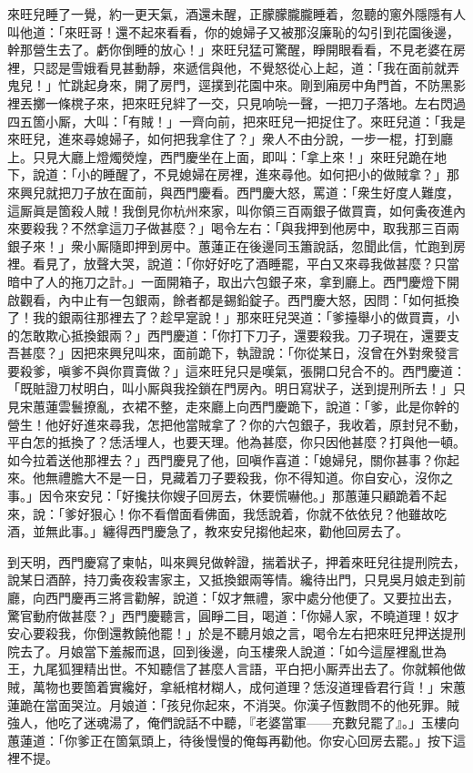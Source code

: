 來旺兒睡了一覺，約一更天氣，酒還未醒，正朦朦朧朧睡着，忽聽的窻外隱隱有人叫他道：「來旺哥！還不起來看看，你的媳婦子又被那沒廉恥的勾引到花園後邊，幹那營生去了。虧你倒睡的放心！」{}來旺兒猛可驚醒，睜開眼看看，不見老婆在房裡，只認是雪娥看見甚動靜，來遞信與他，不覺怒從心上起，道：「我在面前就弄鬼兒！」忙跳起身來，開了房門，逕撲到花園中來。剛到廂房中角門首，不防黑影裡丟擲一條櫈子來，把來旺兒絆了一交，只見响喨一聲，一把刀子落地。左右閃過四五箇小厮，大叫：「有賊！」一齊向前，把來旺兒一把捉住了。來旺兒道：「我是來旺兒，進來尋媳婦子，如何把我拿住了？」衆人不由分說，一步一棍，打到廳上。只見大廳上燈燭熒煌，西門慶坐在上面，即叫：「拿上來！」來旺兒跪在地下，說道：「小的睡醒了，不見媳婦在房裡，進來尋他。如何把小的做賊拿？」那來興兒就把刀子放在面前，與西門慶看。西門慶大怒，罵道：「衆生好度人難度，這厮眞是箇殺人賊！我倒見你杭州來家，叫你領三百兩銀子做買賣，如何夤夜進內來要殺我？不然拿這刀子做甚麼？」喝令左右：「與我押到他房中，取我那三百兩銀子來！」衆小厮隨即押到房中。蕙蓮正在後邊同玉簫說話，忽聞此信，忙跑到房裡。看見了，放聲大哭，說道：「你好好吃了酒睡罷，平白又來尋我做甚麼？只當暗中了人的拖刀之計。」一面開箱子，取出六包銀子來，拿到廳上。西門慶燈下開啟觀看，內中止有一包銀兩，餘者都是錫鉛錠子。西門慶大怒，因問：「如何抵換了！我的銀兩往那裡去了？趁早寔說！」那來旺兒哭道：「爹擡舉小的做買賣，小的怎敢欺心抵換銀兩？」西門慶道：「你打下刀子，還要殺我。刀子現在，還要支吾甚麼？」因把來興兒叫來，面前跪下，執證說：「你從某日，沒曾在外對衆發言要殺爹，嗔爹不與你買賣做？」這來旺兒只是嘆氣，張開口兒合不的。西門慶道：「既賍證刀杖明白，叫小厮與我拴鎖在門房內。明日寫狀子，送到提刑所去！」只見宋蕙蓮雲鬟撩亂，衣裙不整，走來廳上向西門慶跪下，說道：「爹，此是你幹的營生！他好好進來尋我，怎把他當賊拿了？你的六包銀子，我收着，原封兒不動，平白怎的抵換了？恁活埋人，也要天理。他為甚麼，你只因他甚麼？{}打與他一頓。如今拉着送他那裡去？」西門慶見了他，回嗔作喜道：「媳婦兒，關你甚事？你起來。他無禮膽大不是一日，見藏着刀子要殺我，你不得知道。你自安心，沒你之事。」因令來安兒：「好攙扶你嫂子回房去，休要慌嚇他。」{}那蕙蓮只顧跪着不起來，說：「爹好狠心！你不看僧面看佛面，我恁說着，你就不依依兒？{}他雖故吃酒，並無此事。」纏得西門慶急了，教來安兒搊他起來，勸他回房去了。

到天明，西門慶寫了柬帖，叫來興兒做幹證，揣着狀子，押着來旺兒往提刑院去，說某日酒醉，持刀夤夜殺害家主，又抵換銀兩等情。纔待出門，只見吳月娘走到前廳，向西門慶再三將言勸解，說道：「奴才無禮，家中處分他便了。又要拉出去，驚官動府做甚麼？」西門慶聽言，圓睜二目，喝道：「你婦人家，不曉道理！奴才安心要殺我，你倒還教饒他罷！」{}於是不聽月娘之言，喝令左右把來旺兒押送提刑院去了。月娘當下羞赧而退，回到後邊，向玉樓衆人說道：「如今這屋裡亂世為王，九尾狐狸精出世。不知聽信了甚麼人言語，平白把小厮弄出去了。你就賴他做賊，萬物也要箇着實纔好，拿紙棺材糊人，成何道理？恁沒道理昏君行貨！」宋蕙蓮跪在當面哭泣。月娘道：「孩兒你起來，不消哭。你漢子恆數問不的他死罪。賊強人，他吃了迷魂湯了，俺們說話不中聽，『老婆當軍——充數兒罷了』。」玉樓向蕙蓮道：「你爹正在箇氣頭上，待後慢慢的俺每再勸他。你安心回房去罷。」按下這裡不提。


